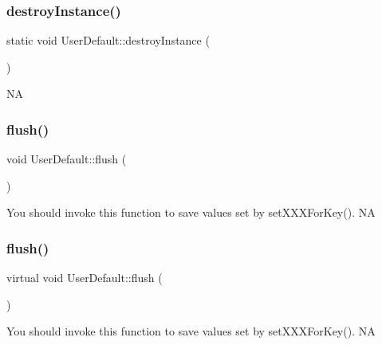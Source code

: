 \subsubsection{\texorpdfstring{destroy\+Instance()}{destroyInstance()}\hspace{0.1cm}{\footnotesize\ttfamily [2/2]}}
{\footnotesize\ttfamily static void User\+Default\+::destroy\+Instance (\begin{DoxyParamCaption}{ }\end{DoxyParamCaption})\hspace{0.3cm}{\ttfamily [static]}}

NA \mbox{\label{classUserDefault_a6633f895457c6a225c46a559afb86f80}} 
\subsubsection{\texorpdfstring{flush()}{flush()}\hspace{0.1cm}{\footnotesize\ttfamily [1/2]}}
{\footnotesize\ttfamily void User\+Default\+::flush (\begin{DoxyParamCaption}{ }\end{DoxyParamCaption})\hspace{0.3cm}{\ttfamily [virtual]}}

You should invoke this function to save values set by set\+X\+X\+X\+For\+Key().  NA \mbox{\label{classUserDefault_a5ac32c77783bf00480575f8bbe619a7e}} 
\subsubsection{\texorpdfstring{flush()}{flush()}\hspace{0.1cm}{\footnotesize\ttfamily [2/2]}}
{\footnotesize\ttfamily virtual void User\+Default\+::flush (\begin{DoxyParamCaption}{ }\end{DoxyParamCaption})\hspace{0.3cm}{\ttfamily [virtual]}}

You should invoke this function to save values set by set\+X\+X\+X\+For\+Key().  NA \mbox{\label{classUserDefault_a81d252db31d6e11ae2e1ded0e0bdce5c}} 
